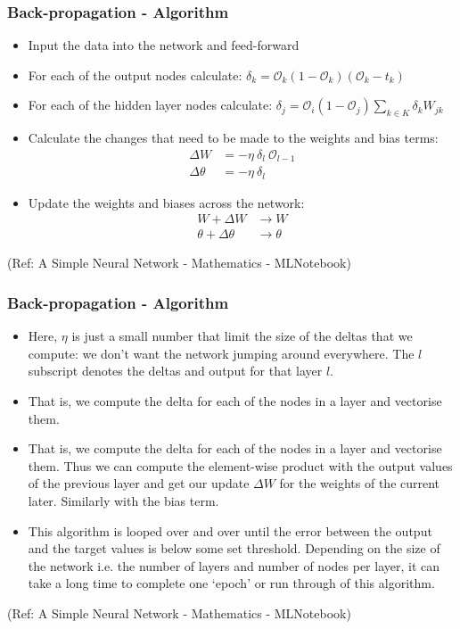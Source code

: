 \begin{frame}[fragile] \frametitle{Back-propagation - Algorithm}

\begin{itemize}
\item Input the data into the network and feed-forward
\item For each of the output nodes calculate: $\delta_{k} = \mathcal{O}_{k}  \left( 1 - \mathcal{O}_{k}  \right)  \left( \mathcal{O}_{k} - t_{k} \right)$
\item For each of the hidden layer nodes calculate: $\delta_{j} = \mathcal{O}_{i} \left( 1 - \mathcal{O}_{j} \right)   \sum_{k \in K} \delta_{k} W_{jk}$
\item Calculate the changes that need to be made to the weights and bias terms:
\begin{align}
\Delta W &= -\eta \ \delta_{l} \ \mathcal{O}_{l-1} \\
\Delta\theta &= -\eta \ \delta_{l}
\end{align}
\item Update the weights and biases across the network:
\begin{align}
W + \Delta W &\rightarrow W \\
\theta + \Delta\theta &\rightarrow \theta
\end{align}
\end{itemize}

\tiny{(Ref: A Simple Neural Network - Mathematics - MLNotebook)}
\end{frame}


\begin{frame}[fragile] \frametitle{Back-propagation - Algorithm}

\begin{itemize}
\item Here, $\eta$ is just a small number that limit the size of the deltas that we compute: 
we don’t want the network jumping around everywhere. The $l$ subscript denotes the deltas and output for that layer $l$. 
\item That is, we compute the delta for each of the nodes in a layer and vectorise them. 
\item That is, we compute the delta for each of the nodes in a layer and vectorise them. Thus we can compute the element-wise product with the output values of the previous layer and get our update 
$\Delta W$ for the weights of the current later. Similarly with the bias term.

\item This algorithm is looped over and over until the error between the output and the target values is below some set threshold. Depending on the size of the network i.e. the number of layers and number of nodes per layer, it can take a long time to complete one ‘epoch' or run through of this algorithm.
\end{itemize}

\tiny{(Ref: A Simple Neural Network - Mathematics - MLNotebook)}
\end{frame}



